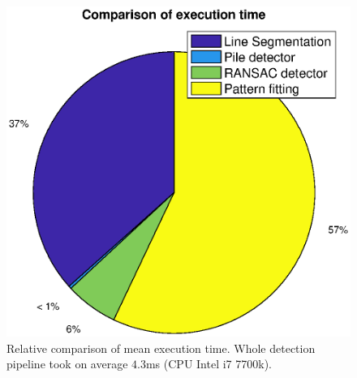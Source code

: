 \begin{figure}[H]
	\centering
	\includegraphics[scale=0.55]{fig/time.eps}
	\caption[Experiment results]{Relative comparison of mean execution time. Whole detection pipeline took on average $4.3$ms (CPU Intel i7 7700k).}
	\label{fig:time}
\end{figure}

